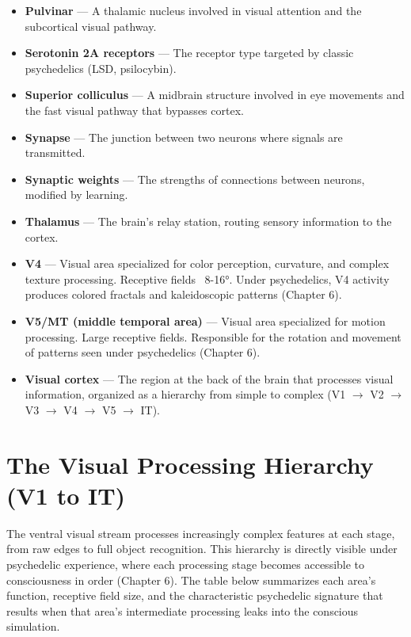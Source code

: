 \documentclass[11pt, twoside, openright]{book}
\begin{document}
\begin{itemize}
  \item \textbf{Pulvinar} --- A thalamic nucleus involved in visual attention and the subcortical visual pathway.
  \item \textbf{Serotonin 2A receptors} --- The receptor type targeted by classic psychedelics (LSD, psilocybin).
  \item \textbf{Superior colliculus} --- A midbrain structure involved in eye movements and the fast visual pathway that bypasses cortex.
  \item \textbf{Synapse} --- The junction between two neurons where signals are transmitted.
  \item \textbf{Synaptic weights} --- The strengths of connections between neurons, modified by learning.
  \item \textbf{Thalamus} --- The brain's relay station, routing sensory information to the cortex.
  \item \textbf{V4} --- Visual area specialized for color perception, curvature, and complex texture processing. Receptive fields ~8-16°. Under psychedelics, V4 activity produces colored fractals and kaleidoscopic patterns (Chapter 6).
  \item \textbf{V5/MT (middle temporal area)} --- Visual area specialized for motion processing. Large receptive fields. Responsible for the rotation and movement of patterns seen under psychedelics (Chapter 6).
  \item \textbf{Visual cortex} --- The region at the back of the brain that processes visual information, organized as a hierarchy from simple to complex (V1 $\rightarrow$ V2 $\rightarrow$ V3 $\rightarrow$ V4 $\rightarrow$ V5 $\rightarrow$ IT).
\end{itemize}

\section*{The Visual Processing Hierarchy (V1 to IT)}

The ventral visual stream processes increasingly complex features at each stage, from raw edges to full object recognition. This hierarchy is directly visible under psychedelic experience, where each processing stage becomes accessible to consciousness in order (Chapter 6). The table below summarizes each area's function, receptive field size, and the characteristic psychedelic signature that results when that area's intermediate processing leaks into the conscious simulation.


\clearpage
\ifodd\value{page}\hbox{}\thispagestyle{empty}\clearpage\fi
\end{document}

